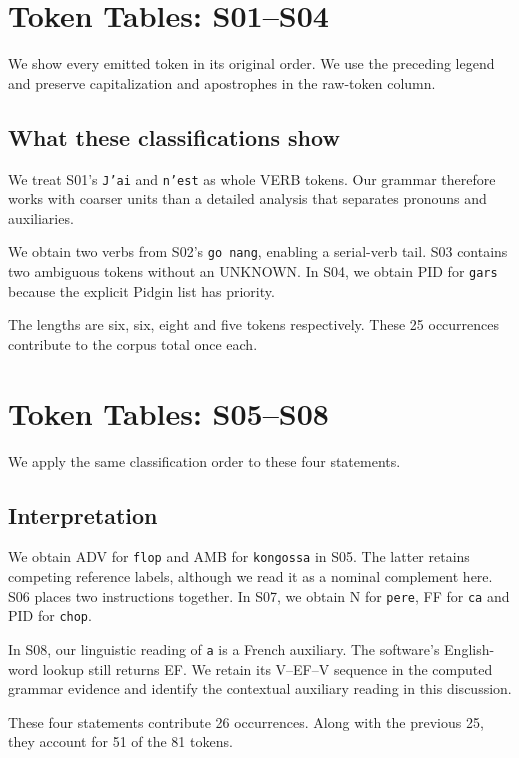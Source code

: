 \documentclass[11pt]{article}
\newcommand{\code}[1]{\texttt{#1}}
\begin{document}
\clearpage
\section{Token Tables: S01--S04}
We show every emitted token in its original order. We use the preceding
legend and preserve capitalization and apostrophes in the raw-token column.

{\small}

\subsection*{What these classifications show}
We treat S01's \code{J'ai} and \code{n'est} as whole VERB tokens. Our grammar
therefore works with coarser units than a detailed analysis that separates
pronouns and auxiliaries.

We obtain two verbs from S02's \code{go nang}, enabling a serial-verb tail.
S03 contains two ambiguous tokens without an UNKNOWN. In S04, we obtain
PID for \code{gars} because the explicit Pidgin list has priority.

The lengths are six, six, eight and five tokens respectively. These 25
occurrences contribute to the corpus total once each.

\clearpage
\section{Token Tables: S05--S08}
We apply the same classification order to these four statements.

{\small}

\subsection*{Interpretation}
We obtain ADV for \code{flop} and AMB for \code{kongossa} in S05.
The latter retains competing reference labels, although we read it as a
nominal complement here. S06 places two instructions together. In S07,
we obtain N for \code{pere}, FF for \code{ca} and PID for \code{chop}.

In S08, our linguistic reading of \code{a} is a French auxiliary. The
software's English-word lookup still returns EF. We retain its V--EF--V
sequence in the computed grammar evidence and identify the contextual
auxiliary reading in this discussion.

These four statements contribute 26 occurrences. Along with the previous 25,
they account for 51 of the 81 tokens.
\end{document}
